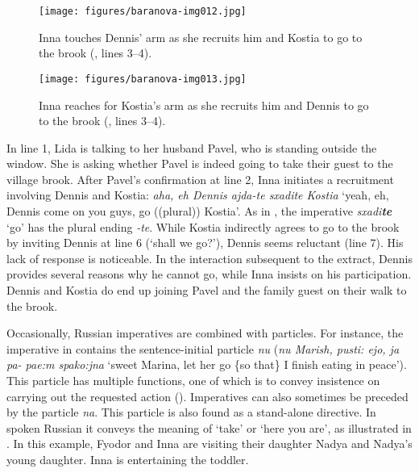 \documentclass[output=paper,modfonts,nonflat]{langsci/langscibook}
\begin{document}
\begin{figure}
\texttt{[image: figures/baranova-img012.jpg]}
\caption{Inna touches Dennis' arm as she recruits him and Kostia to go to the brook (, lines 3--4).}
\label{fig:baranova:12}
\end{figure}

\begin{figure}
\texttt{[image: figures/baranova-img013.jpg]}
\caption{Inna reaches for Kostia's arm as she recruits him and Dennis to go to the brook (, lines 3--4).}
\label{fig:baranova:13}
\end{figure}

In line 1, Lida is talking to her husband Pavel, who is standing outside the window. She is asking whether Pavel is indeed going to take their guest to the village brook. After Pavel’s confirmation at line 2, Inna initiates a recruitment involving Dennis and Kostia: \textit{aha, eh Dennis ajda-te sxadite Kostia} ‘yeah, eh, Dennis come on you guys, go ((plural)) Kostia’. As in , the imperative \textit{sxadi}\textbf{\textit{te}} ‘go’ has the plural ending \textit{-te}. While Kostia indirectly agrees to go to the brook by inviting Dennis at line 6 (‘shall we go?’), Dennis seems reluctant (line 7). His lack of response is noticeable. In the interaction subsequent to the extract, Dennis provides several reasons why he cannot go, while Inna insists on his participation. Dennis and Kostia do end up joining Pavel and the family guest on their walk to the brook.

Occasionally, Russian imperatives are combined with particles. For instance, the imperative in  contains the sentence-initial particle \textit{nu} (\textit{nu Marish, pusti: ejo, ja pa- pae:m spako:jna} ‘sweet Marina, let her go \{so that\} I finish eating in peace’). This particle has multiple functions, one of which is to convey insistence on carrying out the requested action (\citealt{Bolden2016,bolden2017}). Imperatives can also sometimes be preceded by the particle \textit{na}. This particle is also found as a stand-alone directive. In spoken Russian it conveys the meaning of ‘take’ or ‘here you are’, as illustrated in . In this example, Fyodor and Inna are visiting their daughter Nadya and Nadya's young daughter. Inna is entertaining the toddler.
\end{document}
